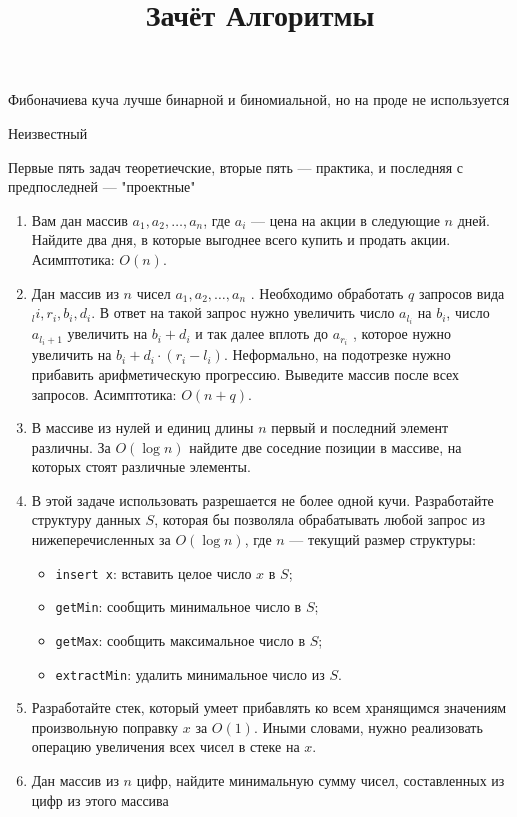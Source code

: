 \documentclass[a4paper, 12pt]{article}
\title{Зачёт Алгоритмы}
\date{}
\begin{document}
    \maketitle
    \epigraph{Фибоначиева куча лучше бинарной и биномиальной, но на проде не используется}{Неизвестный}
    Первые пять задач теоретиечские, вторые пять --- практика, и последняя с предпоследней --- "проектные"
    \begin{enumerate}
        \item Вам дан массив $a_1, a_2, \dots , a_n$, где $a_i$ --- цена на акции в следующие $n$ дней. Найдите два дня,
        в которые выгоднее всего купить и продать акции. Асимптотика: $O(n)$.
        \item Дан массив из $n$ чисел $a_1 , a_2 , \dots , a_n$ . Необходимо обработать $q$ запросов вида $_li, r_i , b_i , d_i$. В
        ответ на такой запрос нужно увеличить число $a_{l_i}$ на $b_i$, число $a_{l_i +1}$ увеличить на $b_i + d_i$ и так далее
        вплоть до $a_{r_i}$ , которое нужно увеличить на $b_i +d_i \cdot (r_i -l_i)$. Неформально, на подотрезке нужно прибавить
        арифметическую прогрессию. Выведите массив после всех запросов. Асимптотика: $O(n + q)$.
        \item В массиве из нулей и единиц длины $n$ первый и последний элемент различны. За $O(\log n)$
        найдите две соседние позиции в массиве, на которых стоят различные элементы.
        \item В этой задаче использовать разрешается не более одной кучи. Разработайте структуру
        данных $S$, которая бы позволяла обрабатывать любой запрос из нижеперечисленных за $O(\log n)$, где $n$ --- текущий размер структуры:
        \begin{itemize}
            \item \verb|insert x|: вставить целое число $x$ в $S$;
            \item \verb|getMin|: сообщить минимальное число в $S$;
            \item \verb|getMax|: сообщить максимальное число в $S$;
            \item \verb|extractMin|: удалить минимальное число из $S$.
        \end{itemize}
        \item Разработайте стек, который умеет прибавлять ко всем хранящимся значениям произвольную поправку $x$ за $O(1)$. Иными словами, нужно реализовать операцию увеличения всех чисел в стеке на $x$.
        \item Дан массив из $n$ цифр, найдите минимальную сумму чисел, составленных из цифр из этого массива 

\end{enumerate}
\end{document}

